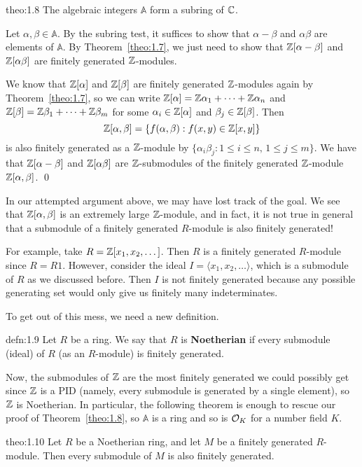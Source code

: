 \begin{theo}{theo:1.8}
    The algebraic integers $\mathbb{A}$ form a subring of $\mathbb{C}$.
\end{theo}
\begin{pf}
    Let $\alpha, \beta \in \mathbb{A}$. By the subring test, it suffices to show that 
    $\alpha - \beta$ and $\alpha\beta$ are elements of $\mathbb{A}$. By 
    Theorem~\ref{theo:1.7}, we just need to show that $\mathbb{Z}[\alpha - \beta]$ 
    and $\mathbb{Z}[\alpha\beta]$ are finitely generated $\mathbb{Z}$-modules. 

    We know that $\mathbb{Z}[\alpha]$ and $\mathbb{Z}[\beta]$ are finitely generated 
    $\mathbb{Z}$-modules again by Theorem~\ref{theo:1.7}, so 
    we can write $\mathbb{Z}[\alpha] = \mathbb{Z}\alpha_1 + \cdots + \mathbb{Z}\alpha_n$ and 
    $\mathbb{Z}[\beta] = \mathbb{Z}\beta_1 + \cdots + \mathbb{Z}\beta_m$ for some 
    $\alpha_i \in \mathbb{Z}[\alpha]$ and $\beta_j \in \mathbb{Z}[\beta]$. Then 
    \[ \mathbb{Z}[\alpha, \beta] = \{f(\alpha, \beta) : f(x, y) \in \mathbb{Z}[x, y]\} \] 
    is also finitely generated as a $\mathbb{Z}$-module by 
    $\{\alpha_i \beta_j : 1 \leq i \leq n,\, 1 \leq j \leq m\}$. We have 
    that $\mathbb{Z}[\alpha-\beta]$ and $\mathbb{Z}[\alpha\beta]$ are $\mathbb{Z}$-submodules of 
    the finitely generated $\mathbb{Z}$-module $\mathbb{Z}[\alpha, \beta]$. \qed
\end{pf}

In our attempted argument above, we may have lost track of the goal. 
We see that $\mathbb{Z}[\alpha, \beta]$ is an extremely large $\mathbb{Z}$-module, and in 
fact, it is not true in general that a submodule of a finitely generated 
$R$-module is also finitely generated!

For example, take $R = \mathbb{Z}[x_1, x_2, \dots]$. Then $R$ is a finitely generated 
$R$-module since $R = R1$. However, consider the ideal $I = 
\langle x_1, x_2, \dots \rangle$, which is a submodule of $R$ as we 
discussed before. Then $I$ is not finitely generated because any 
possible generating set would only give us finitely many indeterminates. 

To get out of this mess, we need a new definition. 

\begin{defn}{defn:1.9}
    Let $R$ be a ring. We say that $R$ is {\bf Noetherian} if every 
    submodule (ideal) of $R$ (as an $R$-module) is finitely generated. 
\end{defn}

Now, the submodules of $\mathbb{Z}$ are the most finitely generated we could 
possibly get since $\mathbb{Z}$ is a PID (namely, every submodule is 
generated by a single element), so $\mathbb{Z}$ is Noetherian. In particular, the 
following theorem is enough to rescue our proof of Theorem~\ref{theo:1.8},
so $\mathbb{A}$ is a ring and so is ${\cal O}_K$ for a number field $K$. 

\begin{theo}{theo:1.10}
    Let $R$ be a Noetherian ring, and let $M$ be a finitely generated $R$-module. 
    Then every submodule of $M$ is also finitely generated. 
\end{theo}